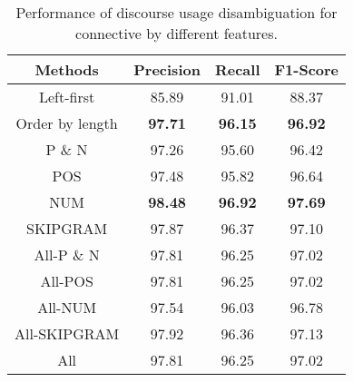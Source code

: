 \begin{table}[ht]
\centering
\begin{tabular}{|c|c|c|c|}
\hline

\bf Methods             & \bf Precision & \bf Recall & \bf F1-Score \\ \hline
    Left-first          &     85.89     &     91.01  &     88.37    \\ \hline
    Order by length     & \bf 97.71     & \bf 96.15  & \bf 96.92    \\

\hhline{|=|=|=|=|}
    P \& N              &     97.26     &     95.60  &     96.42    \\ \hline
    POS                 &     97.48     &     95.82  &     96.64    \\ \hline
    NUM                 & \bf 98.48     & \bf 96.92  & \bf 97.69    \\ \hline
    SKIPGRAM            &     97.87     &     96.37  &     97.10    \\ \hline
    All-P \& N          &     97.81     &     96.25  &     97.02    \\ \hline
    All-POS             &     97.81     &     96.25  &     97.02    \\ \hline
    All-NUM             &     97.54     &     96.03  &     96.78    \\ \hline
    All-SKIPGRAM        &     97.92     &     96.36  &     97.13    \\ \hline
    All                 &     97.81     &     96.25  &     97.02    \\ \hline


\end{tabular}
\caption{\label{t:perfect-length} Performance of discourse usage
disambiguation for connective by different features. }
\end{table}
